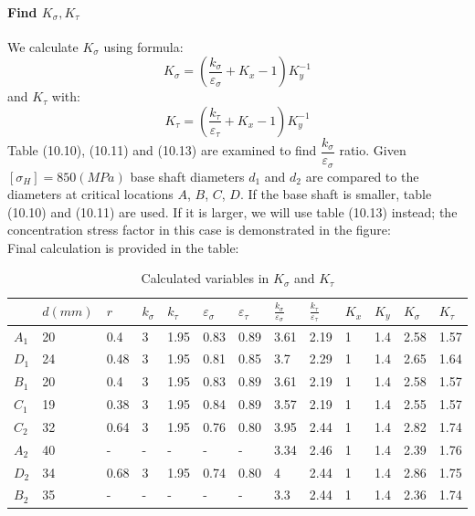 \paragraph{Find $ K_{\sigma}, K_\tau $} We calculate $ K_{\sigma} $ using formula:
\[ K_{\sigma} = \left( \dfrac{k_\sigma}{\varepsilon_\sigma} + K_x - 1\right) K_y^{-1} \]
and $ K_\tau $ with:
\[ K_{\tau} = \left( \dfrac{k_\tau}{\varepsilon_\tau} + K_x - 1\right) K_y^{-1} \]
Table (10.10), (10.11) and (10.13) are examined to find $ \dfrac{k_\sigma}{\varepsilon_\sigma} $ ratio. Given $ [\sigma_H] = 850 \unit{(MPa)} $ base shaft diameters $ d_1 $ and $ d_2 $ are compared to the diameters at critical locations $ A $, $ B $, $ C $, $ D $. If the base shaft is smaller, table (10.10) and (10.11) are used. If it is larger, we will use table (10.13) instead; the concentration stress factor in this case is demonstrated in the figure:\\


Final calculation is provided in the table:

\begin{table}[ht]
	\begin{tabular}{|l|l|l|l|l|l|l|l|l|l|l|l|l|}
		\hline
		\rowcolor[HTML]{C0C0C0} 
		&
		$d\unit{(mm)}$ &
		$r$ &
		$k_\sigma$ &
		$k_\tau$ &
		$\varepsilon_\sigma$ &
		$\varepsilon_\tau$ &
		$\frac{k_\sigma}{\varepsilon_\sigma}$ &
		$\frac{k_\tau}{\varepsilon_\tau}$ &
		$K_x$ &
		$K_y$ &
		$K_\sigma$ &
		$K_\tau$ \\ \hline
		\cellcolor[HTML]{C0C0C0}$A_1$ & 20 & 0.4  & 3 & 1.95 & 0.83 & 0.89 & 3.61 & 2.19 & 1 & 1.4 & 2.58 & 1.57 \\ \hline
		\cellcolor[HTML]{C0C0C0}$D_1$ & 24 & 0.48 & 3 & 1.95 & 0.81 & 0.85 & 3.7  & 2.29 & 1 & 1.4 & 2.65 & 1.64 \\ \hline
		\cellcolor[HTML]{C0C0C0}$B_1$ & 20 & 0.4  & 3 & 1.95 & 0.83 & 0.89 & 3.61 & 2.19 & 1 & 1.4 & 2.58 & 1.57 \\ \hline
		\cellcolor[HTML]{C0C0C0}$C_1$ & 19 & 0.38 & 3 & 1.95 & 0.84 & 0.89 & 3.57 & 2.19 & 1 & 1.4 & 2.55 & 1.57 \\ \hline
		\cellcolor[HTML]{C0C0C0}$C_2$ & 32 & 0.64 & 3 & 1.95 & 0.76 & 0.80 & 3.95 & 2.44 & 1 & 1.4 & 2.82 & 1.74 \\ \hline
		\cellcolor[HTML]{C0C0C0}$A_2$ & 40 & -    & - & -    & -    & -    & 3.34 & 2.46 & 1 & 1.4 & 2.39 & 1.76 \\ \hline
		\cellcolor[HTML]{C0C0C0}$D_2$ & 34 & 0.68 & 3 & 1.95 & 0.74 & 0.80 & 4 & 2.44 & 1 & 1.4 & 2.86 & 1.75 \\ \hline
		\cellcolor[HTML]{C0C0C0}$B_2$ & 35 & -    & - & -    & -    & -    & 3.3  & 2.44 & 1 & 1.4 & 2.36 & 1.74 \\ \hline
	\end{tabular}
	\caption{Calculated variables in $ K_\sigma $ and $ K_\tau $}
\end{table}
